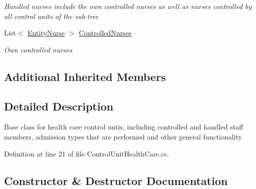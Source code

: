 \begin{DoxyCompactItemize}
\begin{DoxyCompactList}\small\item\em Handled nurses include the own controlled nurses as well as nurses controlled by all control units of the sub-\/tree \end{DoxyCompactList}\item 
List$<$ \hyperlink{class_general_health_care_elements_1_1_entities_1_1_entity_nurse}{Entity\+Nurse} $>$ \hyperlink{class_general_health_care_elements_1_1_control_units_1_1_control_unit_health_care_a9fd90e0dc59e4d1be2b42cd1ad862737}{Controlled\+Nurses}
\begin{DoxyCompactList}\small\item\em Own controlled nurses \end{DoxyCompactList}\end{DoxyCompactItemize}
\subsection*{Additional Inherited Members}


\subsection{Detailed Description}
Base class for health care control untis, including controlled and handled staff members, admission types that are performed and other general functionality 



Definition at line 21 of file Control\+Unit\+Health\+Care.\+cs.



\subsection{Constructor \& Destructor Documentation}

